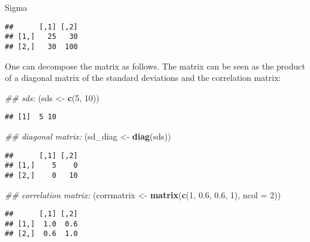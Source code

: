 \documentclass[12pt,]{krantz}
\newenvironment{Shaded}{\begin{snugshade}}{\end{snugshade}}
\newcommand{\CommentTok}[1]{\textcolor[rgb]{0.56,0.35,0.01}{\textit{#1}}}
\newcommand{\DataTypeTok}[1]{\textcolor[rgb]{0.13,0.29,0.53}{#1}}
\newcommand{\DecValTok}[1]{\textcolor[rgb]{0.00,0.00,0.81}{#1}}
\newcommand{\FloatTok}[1]{\textcolor[rgb]{0.00,0.00,0.81}{#1}}
\newcommand{\KeywordTok}[1]{\textcolor[rgb]{0.13,0.29,0.53}{\textbf{#1}}}
\newcommand{\NormalTok}[1]{#1}
\newcommand{\StringTok}[1]{\textcolor[rgb]{0.31,0.60,0.02}{#1}}
\begin{document}
\begin{Shaded}
\begin{Highlighting}[]
\NormalTok{Sigma}
\end{Highlighting}
\end{Shaded}

\begin{verbatim}
##      [,1] [,2]
## [1,]   25   30
## [2,]   30  100
\end{verbatim}

One can decompose the matrix as follows. The matrix can be seen as the product of a diagonal matrix of the standard deviations and the correlation matrix:

\begin{Shaded}
\begin{Highlighting}[]
\CommentTok{## sds:}
\NormalTok{(sds <-}\StringTok{ }\KeywordTok{c}\NormalTok{(}\DecValTok{5}\NormalTok{, }\DecValTok{10}\NormalTok{))}
\end{Highlighting}
\end{Shaded}

\begin{verbatim}
## [1]  5 10
\end{verbatim}

\begin{Shaded}
\begin{Highlighting}[]
\CommentTok{## diagonal matrix:}
\NormalTok{(sd_diag <-}\StringTok{ }\KeywordTok{diag}\NormalTok{(sds))}
\end{Highlighting}
\end{Shaded}

\begin{verbatim}
##      [,1] [,2]
## [1,]    5    0
## [2,]    0   10
\end{verbatim}

\begin{Shaded}
\begin{Highlighting}[]
\CommentTok{## correlation matrix:}
\NormalTok{(corrmatrix <-}\StringTok{ }\KeywordTok{matrix}\NormalTok{(}\KeywordTok{c}\NormalTok{(}\DecValTok{1}\NormalTok{, }\FloatTok{0.6}\NormalTok{, }\FloatTok{0.6}\NormalTok{, }\DecValTok{1}\NormalTok{), }
  \DataTypeTok{ncol =} \DecValTok{2}\NormalTok{))}
\end{Highlighting}
\end{Shaded}

\begin{verbatim}
##      [,1] [,2]
## [1,]  1.0  0.6
## [2,]  0.6  1.0
\end{verbatim}
\end{document}
